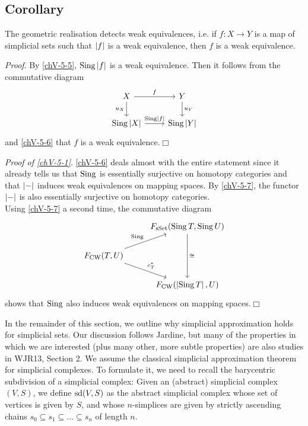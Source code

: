     \subsection{Corollary}\label{chV-5-8}
        The geometric realisation detects weak equivalences, i.e. if $f \colon X \to Y$ is a map of simplicial sets such that $\left| f \right|$ is a weak equivalence, then $f$ is a weak equivalence.
        \smallskip

        \emph{Proof}. By \ref{chV-5-5}, $\operatorname{Sing} \left| f \right|$ is a weak equivalence. Then it follows from the commutative diagram
        \begin{equation*}
            \begin{tikzcd}
                X \arrow[d, "u_X"'] \arrow[r, "f"] & Y \arrow[d, "u_Y"] \\
                \Sing \gr{X} \arrow[r, "\Sing \gr{f}"] & \Sing \gr{Y}
            \end{tikzcd}
        \end{equation*}
        and \ref{chV-5-6} that $f$ is a weak equivalence.\hfill$\Box$
        \medskip

        \emph{Proof of \ref{chV-5-1}}. \ref{chV-5-6} deals almost with the entire statement since it already tells us that $\operatorname{Sing}$ is essentially surjective on homotopy categories and that $\left| - \right|$ induces weak equivalences on mapping spaces. By \ref{chV-5-7}, the functor $\left| - \right|$ is also essentially surjective on homotopy categories.\\
        Using \ref{chV-5-7} a second time, the commutative diagram
        \begin{equation*}
            \begin{tikzcd}
                & F_{\sSet}(\Sing T, \Sing U) \arrow[dd, "\cong"] \\
                F_{\CW}(T, U) \arrow[ur, "\Sing"] \arrow[dr, "c^{*}_T"] & \\
                & F_{\CW}(\gr{\Sing T}, U)
            \end{tikzcd}
        \end{equation*}
        shows that $\operatorname{Sing}$ also induces weak equivalences on mapping spaces.\hfill$\Box$
        \medskip

        In the remainder of this section, we outline why simplicial approximation holds for simplicial sets. Our discussion follows Jardine, but many of the properties in which we are interested (plus many other, more subtle properties) are also studies in WJR13, Section 2. We assume the classical simplicial approximation theorem for simplicial complexes. To formulate it, we need to recall the barycentric subdivision of a simplicial complex: Given an (abstract) simplicial complex $(V, S)$, we define $\operatorname{sd}(V, S)$ as the abstract simplicial complex whose set of vertices is given by $S$, and whose $n$-simplices are given by strictly ascending chains $s_0 \subseteq s_1 \subseteq \ldots \subseteq s_n$ of length $n$.

